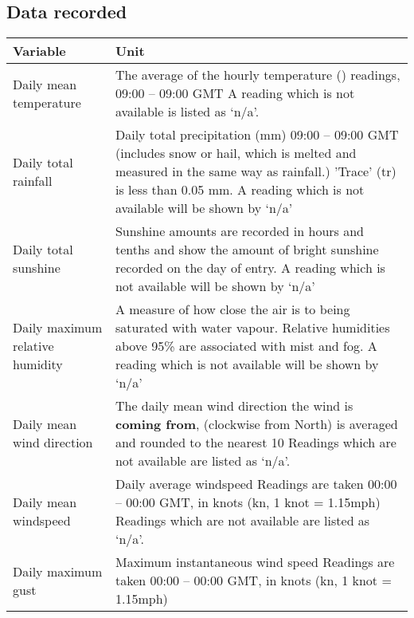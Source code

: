\subsection{Data recorded}
\begin{tabular}{|p{5.5cm}|p{11.5cm}|}
	\hline
	\textbf{Variable} & \textbf{Unit} \\
	\hline
	Daily mean temperature & The average of the hourly temperature (\textcelsius) readings, 09:00 – 09:00 GMT \newline A reading which is not available is listed as ‘n/a’.
	\\
	\hline
	Daily total rainfall & Daily total precipitation (mm) 09:00 – 09:00 GMT
	(includes snow or hail, which is melted and measured in the same way as rainfall.) \newline
	'Trace' (tr) is less than 0.05 mm. \newline A reading which is not available will be shown by ‘n/a’
	\\
	\hline
	Daily total sunshine & Sunshine amounts are recorded in hours and tenths and show the amount of bright sunshine recorded on the day of entry. \newline A reading which is not available will be shown by ‘n/a’ \\
	\hline
	Daily maximum relative humidity & A measure of how close the air is to being saturated with water vapour. \newline Relative humidities above 95\% are associated with mist and fog. \newline A reading which is not available will be shown by ‘n/a’
	\\
	\hline
	Daily mean wind direction & The daily mean wind direction the wind is \textbf{coming from}, (clockwise from North) is averaged and rounded to the nearest 10\textdegree \newline
	Readings which are not available are listed as ‘n/a’.
	\\
	\hline
	Daily mean windspeed & Daily average windspeed \newline Readings are taken 00:00 – 00:00 GMT, in knots (kn, 1 knot = 1.15mph) \newline
	Readings which are not available are listed as ‘n/a’. \\
	\hline
	Daily maximum gust & Maximum instantaneous wind speed \newline Readings are taken 00:00 – 00:00 GMT, in knots (kn, 1 knot = 1.15mph) \newline

\end{tabular}
